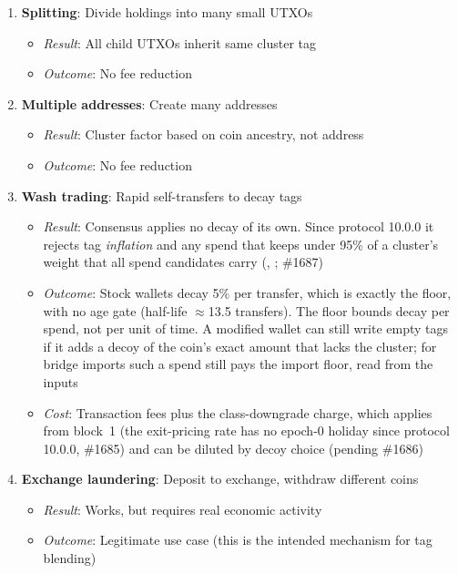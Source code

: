 \begin{enumerate}
  \item \textbf{Splitting}: Divide holdings into many small UTXOs
    \begin{itemize}
      \item \textit{Result}: All child UTXOs inherit same cluster tag
      \item \textit{Outcome}: No fee reduction
    \end{itemize}

  \item \textbf{Multiple addresses}: Create many addresses
    \begin{itemize}
      \item \textit{Result}: Cluster factor based on coin ancestry, not
        address
      \item \textit{Outcome}: No fee reduction
    \end{itemize}

  \item \textbf{Wash trading}: Rapid self-transfers to decay tags
    \begin{itemize}
      \item \textit{Result}: Consensus applies no decay of its own. Since
        protocol 10.0.0 it rejects tag \emph{inflation} and any spend that
        keeps under 95\% of a cluster's weight that all spend candidates
        carry (,
        ; \#1687)
      \item \textit{Outcome}: Stock wallets decay 5\% per transfer, which is
        exactly the floor, with no age gate (half-life $\approx$13.5
        transfers). The floor bounds decay per spend, not per unit of time.
        A modified wallet can still write empty tags if it adds a decoy of
        the coin's exact amount that lacks the cluster; for bridge imports
        such a spend still pays the import floor, read from the inputs
      \item \textit{Cost}: Transaction fees plus the class-downgrade charge,
        which applies from block~1 (the exit-pricing rate has no epoch-0
        holiday since protocol 10.0.0, \#1685) and can be diluted by decoy
        choice (pending \#1686)
    \end{itemize}

  \item \textbf{Exchange laundering}: Deposit to exchange, withdraw different
    coins
    \begin{itemize}
      \item \textit{Result}: Works, but requires real economic activity
      \item \textit{Outcome}: Legitimate use case (this is the intended
        mechanism for tag blending)
    \end{itemize}
\end{enumerate}

